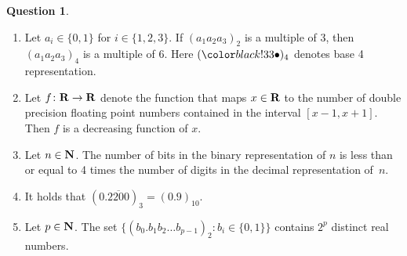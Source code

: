 \documentclass[11pt]{article}
\theoremstyle{definition}
\newtheorem{question}{Question}
\begin{document}
\begin{question}
\begin{enumerate}
        \item
            Let $a_i \in \{0, 1\}$ for $i \in \{1, 2, 3\}$.
            If $(a_1 a_2 a_3)_2$ is a multiple of 3,
            then $(a_1 a_2 a_3)_4$ is a multiple of 6.
            Here $(\placeholder)_4$ denotes base 4 representation.

        \item
            Let $f\colon \mathbf R \to \mathbf R$ denote the function that maps $x \in \mathbf R$
            to the number of double precision floating point numbers contained in the interval $[x-1, x+1]$.
            Then $f$ is a decreasing function of $x$.

        \item
            Let $n \in \mathbf N$.
            The number of bits in the binary representation of $n$ is less than or equal to 4 times the number of digits in the decimal representation of~$n$.

        \item
            It holds that $(0.\overline{2200})_3 = (0.9)_{10}$.

        \item
            Let $p \in \mathbf N$.
            The set
            \(
                \bigl\{ (b_0. b_1 b_2 \dots b_{p-1})_2 \colon b_i \in \{0, 1\} \bigr\}
            \)
            contains $2^{p}$ distinct real numbers.
    \end{enumerate}
\end{question}
\end{document}
